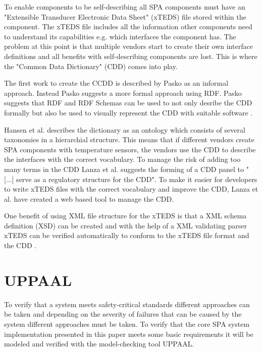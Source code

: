 
To enable components to be self-describing all SPA components must have an
"Extensible Transducer Electronic Data Sheet" (xTEDS) file stored within the
component. The xTEDS file includes all the information other components need to
understand its capabilities e.g. which interfaces the component has. The
problem at this point is that multiple vendors start to create their own
interface definitions and all benefits with self-describing components are
lost. This is where the "Common Data Dictionary" (CDD) comes into play.


The first work to create the CCDD is described by Pasko as an informal
approach.  Instead Pasko suggests a more formal approach using RDF. Pasko
suggests that RDF and RDF Schemas can be used to not only desribe the CDD
formally but also be used to visually represent the CDD with suitable software
\cite{pasko2011}.

Hansen et al. \cite{hansen2012} describes the dictionary as an ontology which
consists of several taxonomies in a hierarchial structure. This means that if
different vendors create SPA components with temperature sensors, the vendors
use the CDD to describe the interfaces with the correct vocabulary. To manage
the risk of adding too many terms in the CDD Lanza et al. \cite{lanza2010}
suggests the forming of a CDD panel to "[...] serve as a regulatory structure
for the CDD". To make it easier for developers to write xTEDS files with the
correct vocabulary and improve the CDD, Lanza et al.  \cite{lanza2010} have
created a web based tool to manage the CDD.

One benefit of using XML file structure for the xTEDS is that a XML schema
definition (XSD) can be created and with the help of a XML validating parser
xTEDS can be verified automatically to conform to the xTEDS file format and the
CDD \cite{lanza2010}.


\section{UPPAAL}
To verify that a system meets safety-critical standards different approaches
can be taken and depending on the severity of failures that can be caused by
the system different approaches must be taken. To verify that the core SPA
system implementation presented in this paper meets some basic requirements it
will be modeled and verified with the model-checking tool UPPAAL.

